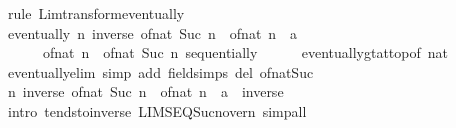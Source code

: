 \begin{isabellebody}
%
\isadelimproof
%
\endisadelimproof
%
\isatagproof
{}\isamarkupfalse%
\ {\isacharparenleft}{\kern0pt}rule\ Lim{\isacharunderscore}{\kern0pt}transform{\isacharunderscore}{\kern0pt}eventually{\isacharparenright}{\kern0pt}\isanewline
\ \ \isamarkupfalse%
\ {\isachardoublequoteopen}eventually\ {\isacharparenleft}{\kern0pt}{\isasymlambda}n{\isachardot}{\kern0pt}\ inverse\ {\isacharparenleft}{\kern0pt}of{\isacharunderscore}{\kern0pt}nat\ {\isacharparenleft}{\kern0pt}Suc\ n{\isacharparenright}{\kern0pt}\ {\isacharslash}{\kern0pt}\ of{\isacharunderscore}{\kern0pt}nat\ n\ {\isacharcolon}{\kern0pt}{\isacharcolon}{\kern0pt}\ {\isacharprime}{\kern0pt}a{\isacharparenright}{\kern0pt}\ {\isacharequal}{\kern0pt}\isanewline
\ \ \ \ \ \ of{\isacharunderscore}{\kern0pt}nat\ n\ {\isacharslash}{\kern0pt}\ of{\isacharunderscore}{\kern0pt}nat\ {\isacharparenleft}{\kern0pt}Suc\ n{\isacharparenright}{\kern0pt}{\isacharparenright}{\kern0pt}\ sequentially{\isachardoublequoteclose}\isanewline
\ \ \ \ \isamarkupfalse%
\ eventually{\isacharunderscore}{\kern0pt}gt{\isacharunderscore}{\kern0pt}at{\isacharunderscore}{\kern0pt}top{\isacharbrackleft}{\kern0pt}of\ {\isachardoublequoteopen}{}{\isacharcolon}{\kern0pt}{\isacharcolon}{\kern0pt}nat{\isachardoublequoteclose}{\isacharbrackright}{\kern0pt}\isanewline
\ \ \ \ \isamarkupfalse%
\ eventually{\isacharunderscore}{\kern0pt}elim\ {\isacharparenleft}{\kern0pt}simp\ add{\isacharcolon}{\kern0pt}\ field{\isacharunderscore}{\kern0pt}simps\ del{\isacharcolon}{\kern0pt}\ of{\isacharunderscore}{\kern0pt}nat{\isacharunderscore}{\kern0pt}Suc{\isacharparenright}{\kern0pt}\isanewline
\ \ \isamarkupfalse%
\ {\isachardoublequoteopen}{\isacharparenleft}{\kern0pt}{\isasymlambda}n{\isachardot}{\kern0pt}\ inverse\ {\isacharparenleft}{\kern0pt}of{\isacharunderscore}{\kern0pt}nat\ {\isacharparenleft}{\kern0pt}Suc\ n{\isacharparenright}{\kern0pt}\ {\isacharslash}{\kern0pt}\ of{\isacharunderscore}{\kern0pt}nat\ n\ {\isacharcolon}{\kern0pt}{\isacharcolon}{\kern0pt}\ {\isacharprime}{\kern0pt}a{\isacharparenright}{\kern0pt}{\isacharparenright}{\kern0pt}\ {\isasymlonglonglongrightarrow}\ inverse\ {}{\isachardoublequoteclose}\isanewline
\ \ \ \ \isamarkupfalse%
\ {\isacharparenleft}{\kern0pt}intro\ tendsto{\isacharunderscore}{\kern0pt}inverse\ LIMSEQ{\isacharunderscore}{\kern0pt}Suc{\isacharunderscore}{\kern0pt}n{\isacharunderscore}{\kern0pt}over{\isacharunderscore}{\kern0pt}n{\isacharparenright}{\kern0pt}\ simp{\isacharunderscore}{\kern0pt}all\isanewline

\end{isabellebody}

